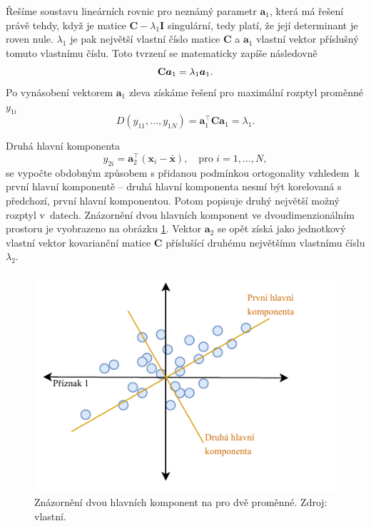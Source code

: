 Řešíme soustavu lineárních rovnic pro neznámý parametr $\bm{a}_1$, která má řešení právě tehdy, když je matice $\mathbf{C} - \lambda_1 \mathbf{I} $ singulární, tedy platí, že její determinant  je roven nule. $\lambda_1$ je pak největší vlastní číslo matice $\mathbf{C}$ a $\bm{a}_1$ vlastní vektor příslušný tomuto vlastnímu číslu. Toto tvrzení se matematicky zapíše následovně
\begin{equation}
    \mathbf{C} \bm{a}_1 = \lambda_1 \bm{a}_1. \\
\end{equation}
Po vynásobení vektorem $\bm{a}_1$ zleva získáme řešení pro maximální rozptyl proměnné $y_{1i}$
\begin{equation}
    D(y_{11}, \ldots, y_{1N}) = \bm{a}_1^\top \mathbf{C} \bm{a}_1 = \lambda_1.
\end{equation}


Druhá hlavní komponenta
\begin{equation}
    y_{2i} = \bm{a}_2^\top (\bm{x}_i - \bar{\bm{x}}), \quad \mbox{pro } i=1,\ldots,N,
\end{equation}
se vypočte obdobným způsobem s přidanou podmínkou ortogonality vzhledem~k první hlavní komponentě -- druhá hlavní komponenta nesmí být korelovaná s předchozí, první hlavní komponentou. Potom popisuje druhý největší možný rozptyl v~datech. Znázornění dvou hlavních komponent ve dvoudimenzionálním prostoru je vyobrazeno na obrázku \ref*{obr:met:PCA1}.
Vektor  $\bm{a}_2$ se opět získá jako jednotkový vlastní vektor kovarianční matice $\mathbf{C}$ příslušící druhému největšímu vlastnímu číslu $\lambda_2$.\cite{bib:PCA1, bib:PCA3} %

\begin{figure}[hbtp!]
    \centering
    \includegraphics[width=\textwidth]{obrazky/PCA.pdf}
    \caption{Znázornění dvou hlavních komponent na pro dvě proměnné. Zdroj: vlastní.}
    \label{obr:met:PCA1}
\end{figure}


